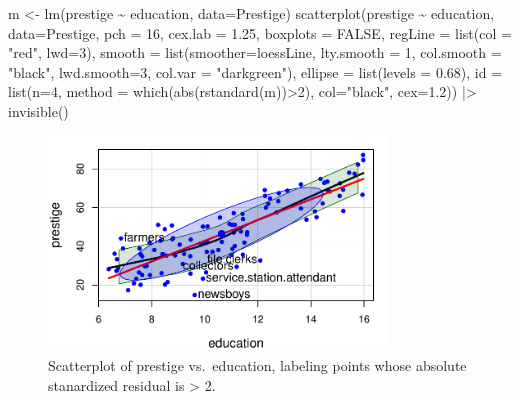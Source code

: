 \documentclass[
  letterpaper,
  10pt,
  krantz2]{krantz}
\makeatletter
\newenvironment{Shaded}{\begin{snugshade}}{\end{snugshade}}
\newcommand{\AttributeTok}[1]{\textcolor[rgb]{0.40,0.45,0.13}{#1}}
\newcommand{\ConstantTok}[1]{\textcolor[rgb]{0.56,0.35,0.01}{#1}}
\newcommand{\DecValTok}[1]{\textcolor[rgb]{0.68,0.00,0.00}{#1}}
\newcommand{\FloatTok}[1]{\textcolor[rgb]{0.68,0.00,0.00}{#1}}
\newcommand{\FunctionTok}[1]{\textcolor[rgb]{0.28,0.35,0.67}{#1}}
\newcommand{\NormalTok}[1]{\textcolor[rgb]{0.00,0.23,0.31}{#1}}
\newcommand{\OtherTok}[1]{\textcolor[rgb]{0.00,0.23,0.31}{#1}}
\newcommand{\SpecialCharTok}[1]{\textcolor[rgb]{0.37,0.37,0.37}{#1}}
\newcommand{\StringTok}[1]{\textcolor[rgb]{0.13,0.47,0.30}{#1}}
\newenvironment{kframe}{%
  \medskip{}
  \setlength{\fboxsep}{.8em}
  \def\at@end@of@kframe{}%
  \ifinner\ifhmode%
  \def\at@end@of@kframe{\end{minipage}}%
  \begin{minipage}{\columnwidth}%
  \fi\fi%
  \def\FrameCommand##1{\hskip\@totalleftmargin \hskip-\fboxsep
  \colorbox{shadecolor}{##1}\hskip-\fboxsep
      \hskip-\linewidth \hskip-\@totalleftmargin \hskip\columnwidth}%
  \MakeFramed {\advance\hsize-\width
    \@totalleftmargin\z@ \linewidth\hsize
    \@setminipage}}%
{\par\unskip\endMakeFramed%
  \at@end@of@kframe}
\renewenvironment{Shaded}{\begin{kframe}}{\end{kframe}}
\makeatother
\begin{document}
\begin{Shaded}
\begin{Highlighting}[]
\NormalTok{m }\OtherTok{\textless{}{-}} \FunctionTok{lm}\NormalTok{(prestige }\SpecialCharTok{\textasciitilde{}}\NormalTok{ education, }\AttributeTok{data=}\NormalTok{Prestige)}
\FunctionTok{scatterplot}\NormalTok{(prestige }\SpecialCharTok{\textasciitilde{}}\NormalTok{ education, }\AttributeTok{data=}\NormalTok{Prestige,}
            \AttributeTok{pch =} \DecValTok{16}\NormalTok{, }\AttributeTok{cex.lab =} \FloatTok{1.25}\NormalTok{,}
            \AttributeTok{boxplots =} \ConstantTok{FALSE}\NormalTok{,}
            \AttributeTok{regLine =} \FunctionTok{list}\NormalTok{(}\AttributeTok{col =} \StringTok{"red"}\NormalTok{, }\AttributeTok{lwd=}\DecValTok{3}\NormalTok{),}
            \AttributeTok{smooth =} \FunctionTok{list}\NormalTok{(}\AttributeTok{smoother=}\NormalTok{loessLine,}
                          \AttributeTok{lty.smooth =} \DecValTok{1}\NormalTok{, }\AttributeTok{col.smooth =} \StringTok{"black"}\NormalTok{, }\AttributeTok{lwd.smooth=}\DecValTok{3}\NormalTok{,}
                          \AttributeTok{col.var =} \StringTok{"darkgreen"}\NormalTok{),}
            \AttributeTok{ellipse =} \FunctionTok{list}\NormalTok{(}\AttributeTok{levels =} \FloatTok{0.68}\NormalTok{),}
            \AttributeTok{id =} \FunctionTok{list}\NormalTok{(}\AttributeTok{n=}\DecValTok{4}\NormalTok{, }\AttributeTok{method =} \FunctionTok{which}\NormalTok{(}\FunctionTok{abs}\NormalTok{(}\FunctionTok{rstandard}\NormalTok{(m))}\SpecialCharTok{\textgreater{}}\DecValTok{2}\NormalTok{), }
                      \AttributeTok{col=}\StringTok{"black"}\NormalTok{, }\AttributeTok{cex=}\FloatTok{1.2}\NormalTok{)) }\SpecialCharTok{|\textgreater{}} \FunctionTok{invisible}\NormalTok{()}
\end{Highlighting}
\end{Shaded}

\begin{figure}

{\centering \includegraphics[width=0.8\textwidth,height=\textheight]{figs/ch03/fig-Prestige-scatterplot-educ2-1.pdf}

}

\caption{\label{fig-Prestige-scatterplot-educ2}Scatterplot of prestige
vs.~education, labeling points whose absolute stanardized residual is
\textgreater{} 2.}

\end{figure}
\end{document}
